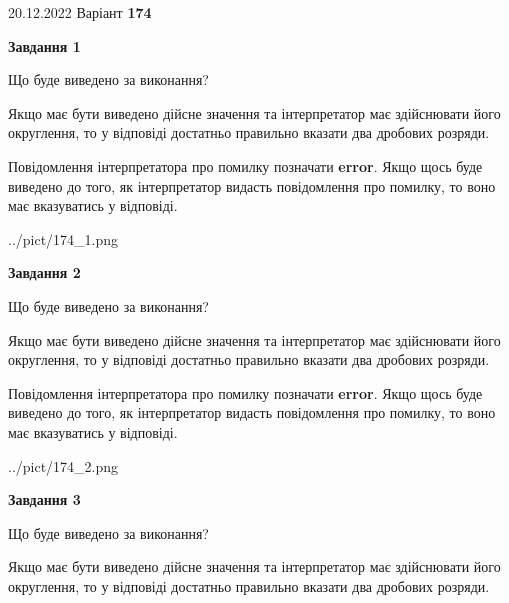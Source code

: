\documentclass[12pt, ukrainian]{article}
\begin{document}
{20.12.2022 Варіант \No \textbf { 174 }\par}
{
\begin {Large}

{\begin {center}\textbf{Завдання 1}\end {center}}\par
Що буде виведено за виконання? \par

Якщо має бути виведено дійсне значення та інтерпретатор має здійснювати його округлення, 
то у відповіді достатньо правильно вказати два дробових розряди.

Повідомлення інтерпретатора про помилку позначати \textbf{error}.
Якщо щось буде виведено до того, як інтерпретатор видасть повідомлення про помилку, 
то воно має вказуватись у відповіді. \par

\begin{center}
	{../pict/174_1.png}
\end{center}
\newpage

{\begin {center}\textbf{Завдання 2}\end {center}}\par
Що буде виведено за виконання? \par

Якщо має бути виведено дійсне значення та інтерпретатор має здійснювати його округлення, 
то у відповіді достатньо правильно вказати два дробових розряди.

Повідомлення інтерпретатора про помилку позначати \textbf{error}.
Якщо щось буде виведено до того, як інтерпретатор видасть повідомлення про помилку, 
то воно має вказуватись у відповіді. \par

\begin{center}
	{../pict/174_2.png}
\end{center}
\newpage

{\begin {center}\textbf{Завдання 3}\end {center}}\par
Що буде виведено за виконання? \par

Якщо має бути виведено дійсне значення та інтерпретатор має здійснювати його округлення, 
то у відповіді достатньо правильно вказати два дробових розряди.


\end{Large}}
\end{document}
